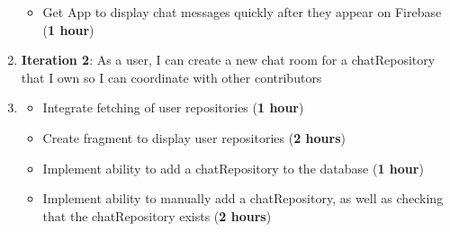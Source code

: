 \documentclass{report}
\begin{document}
\begin{enumerate}
\begin{itemize}
        \item Get App to display chat messages quickly after they appear on Firebase (\textbf{1 hour})
    \end{itemize}
    \item \textbf{Iteration 2}: As a user, I can create a new chat room for a chatRepository that I own so I can coordinate with other contributors
    \item[] \begin{itemize}
        \item Integrate fetching of user repositories (\textbf{1 hour})
        \item Create fragment to display user repositories (\textbf{2 hours})
        \item Implement ability to add a chatRepository to the database (\textbf{1 hour})
        \item Implement ability to manually add a chatRepository, as well as checking that the chatRepository exists (\textbf{2 hours})
    \end{itemize}


\end{enumerate}
\end{document}
